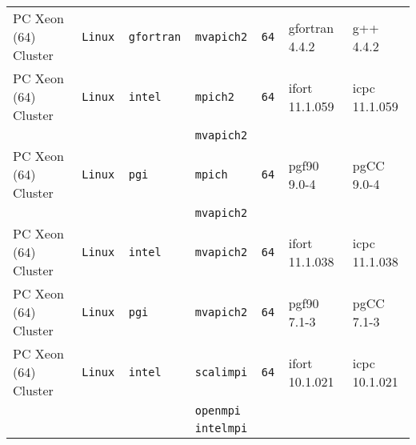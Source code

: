 \begin{tabular}{lllllll}
PC Xeon (64) Cluster  &\tt Linux  &\tt gfortran     &\tt mvapich2   &\tt 64              & gfortran \footnotesize 4.4.2       & g++ \footnotesize 4.4.2         \\ %
PC Xeon (64) Cluster  &\tt Linux  &\tt intel        &\tt mpich2     &\tt 64              & ifort \footnotesize 11.1.059       & icpc \footnotesize 11.1.059     \\ %
                      &           &                 &\tt mvapich2   &                    &                                    &                                 \\
PC Xeon (64) Cluster  &\tt Linux  &\tt pgi          &\tt mpich      &\tt 64              & pgf90 \footnotesize 9.0-4          & pgCC \footnotesize 9.0-4        \\ %
                      &           &                 &\tt mvapich2   &                    &                                    &                                 \\
PC Xeon (64) Cluster  &\tt Linux  &\tt intel        &\tt mvapich2   &\tt 64              & ifort \footnotesize 11.1.038       & icpc \footnotesize 11.1.038     \\ %
PC Xeon (64) Cluster  &\tt Linux  &\tt pgi          &\tt mvapich2   &\tt 64              & pgf90 \footnotesize 7.1-3          & pgCC \footnotesize 7.1-3        \\ %
PC Xeon (64) Cluster  &\tt Linux  &\tt intel        &\tt scalimpi   &\tt 64              & ifort \footnotesize 10.1.021       & icpc \footnotesize 10.1.021     \\ %
                      &           &                 &\tt openmpi    &                    &                                    &                                 \\
                      &           &                 &\tt intelmpi   &                    &                                    &                                 \\

\end{tabular}
